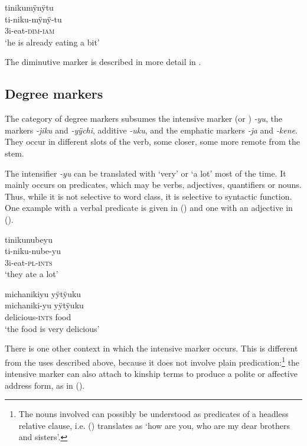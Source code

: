 \ea\label{ex:FirstDim-3}
\begingl
\glpreamble tinikumÿnÿtu\\
\gla ti-niku-mÿnÿ-tu\\
\glb 3i-eat-\textsc{dim}-\textsc{iam}\\
\glft ‘he is already eating a bit’
\endgl
\trailingcitation{[rxx-e181024l.116]}
\xe

The diminutive marker is described in more detail in .

\subsection{Degree markers}\label{sec:AffClDegree}

The category of degree markers subsumes the intensive marker (or ) \textit{-yu}, the  markers \textit{-jiku} and \textit{-yÿchi}, additive \textit{-uku}, and the emphatic markers \textit{-ja} and \textit{-kene}. They occur in different slots of the verb, some closer, some more remote from the stem.

The intensifier \textit{-yu} can be translated with ‘very’ or ‘a lot’ most of the time. It mainly occurs on predicates, which may be verbs, adjectives, quantifiers or nouns. Thus, while it is not selective to word class, it is selective to syntactic function. One example with a verbal predicate is given in () and one with an adjective in ().

\ea\label{ex:FirstINTS-1}
\begingl
\glpreamble tinikunubeyu\\
\gla ti-niku-nube-yu\\
\glb 3i-eat-\textsc{pl}-\textsc{ints}\\
\glft ‘they ate a lot’
\endgl
\trailingcitation{[jxx-e190210s-01]}
\xe

\ea\label{ex:FirstINTS-2}
\begingl
\glpreamble michanikiyu yÿtÿuku\\
\gla michaniki-yu yÿtÿuku\\
\glb delicious-\textsc{ints} food\\
\glft ‘the food is very delicious’
\endgl
\trailingcitation{[jxx-p120430l-2.035]}
\xe


There is one other context in which the intensive marker occurs. This is different from the uses described above, because it does not involve plain predication:\footnote{The nouns involved can possibly be understood as predicates of a headless relative clause, i.e. () translates as ‘how are you, who are my dear brothers and sisters’.} the intensive marker can also attach to kinship terms to produce a polite or affective address form, as in (). 

